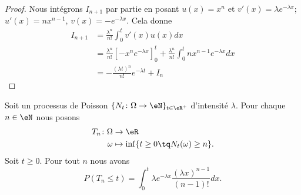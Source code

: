 \begin{proof}
	Nous intégrons \( I_{n+1}\) par partie en posant \( u(x)=x^n\) et \( v'(x)=\lambda e^{-\lambda x}\); \( u'(x)=nx^{n-1}\), \( v(x)=- e^{-\lambda x}\). Cela donne
	\begin{subequations}
		\begin{align}
			I_{n+1} & =\frac{ \lambda^n }{ n! }\int_0^tv'(x)u(x)dx                                                                              \\
			        & =\frac{ \lambda^n }{ n! }\left[ -x^n e^{-\lambda x} \right]_0^t+\frac{ \lambda^n }{ n! }\int_0^tnx^{n-1} e^{-\lambda x}dx \\
			        & =-\frac{ (\lambda t)^n }{ n! } e^{-\lambda t}+I_n
		\end{align}
	\end{subequations}
\end{proof}

\begin{lemma}
	Soit un processus de Poisson \(  \{ N_t\colon \Omega\to \eN \}_{t\in \eR^+}  \) d'intensité \( \lambda\). Pour chaque \( n\in \eN\) nous posons
	\begin{equation}
		\begin{aligned}
			T_n\colon \Omega & \to \eR                                         \\
			\omega           & \mapsto \inf\{ t\geq 0\tq N_t(\omega)\geq n \}.
		\end{aligned}
	\end{equation}
	Soit \( t\geq 0\). Pour tout \( n\) nous avons
	\begin{equation}    \label{EQooRHQLooVxFfjV}
		P(T_n\leq t)=\int_0^t\lambda  e^{-\lambda x}\frac{ (\lambda x)^{n-1} }{ (n-1)! }dx.
	\end{equation}
\end{lemma}

